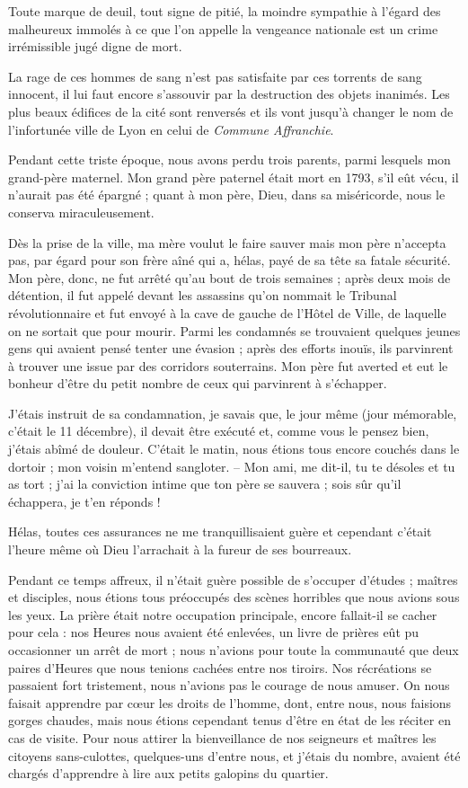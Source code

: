\documentclass[11pt,a4paper]{report}
\begin{document}
Toute marque de deuil, tout signe de pitié, la moindre sympathie à l'égard des malheureux immolés à ce que l'on appelle la vengeance nationale est un crime irrémissible jugé digne de mort.

La rage de ces hommes de sang n'est pas satisfaite par ces torrents de sang innocent, il lui faut encore s'assouvir par la destruction des objets inanimés. Les plus beaux édifices de la cité sont renversés et ils vont jusqu'à changer le nom de l'infortunée ville de Lyon en celui de \textit{Commune Affranchie}.

Pendant cette triste époque, nous avons perdu trois parents, parmi lesquels mon grand-père maternel. Mon grand père paternel était mort en 1793, s'il eût vécu, il n'aurait pas été épargné ; quant à mon père, Dieu, dans sa miséricorde, nous le conserva miraculeusement.

Dès la prise de la ville, ma mère voulut le faire sauver mais mon père n'accepta pas, par égard pour son frère aîné qui a, hélas, payé de sa tête sa fatale sécurité. Mon père, donc, ne fut arrêté qu'au bout de trois semaines ; après deux mois de détention, il fut appelé devant les assassins qu'on nommait le Tribunal révolutionnaire et fut envoyé à la cave de gauche de l'Hôtel de Ville, de laquelle on ne sortait que pour mourir. Parmi les condamnés se trouvaient quelques jeunes gens qui avaient pensé tenter une évasion ; après des efforts inouïs, ils parvinrent à trouver une issue par des corridors souterrains. Mon père fut averted et eut le bonheur d'être du petit nombre de ceux qui parvinrent à s'échapper.

J'étais instruit de sa condamnation, je savais que, le jour même (jour mémorable, c'était le 11 décembre), il devait être exécuté et, comme vous le pensez bien, j'étais abîmé de douleur. C'était le matin, nous étions tous encore couchés dans le dortoir ; mon voisin m'entend sangloter.
-- Mon ami, me dit-il, tu te désoles et tu as tort ; j'ai la conviction intime que ton père se sauvera ; sois sûr qu'il échappera, je t'en réponds !

Hélas, toutes ces assurances ne me tranquillisaient guère et cependant c'était l'heure même où Dieu l'arrachait à la fureur de ses bourreaux.

Pendant ce temps affreux, il n'était guère possible de s'occuper d'études ; maîtres et disciples, nous étions tous préoccupés des scènes horribles que nous avions sous les yeux. La prière était notre occupation principale, encore fallait-il se cacher pour cela : nos Heures nous avaient été enlevées, un livre de prières eût pu occasionner un arrêt de mort ; nous n'avions pour toute la communauté que deux paires d'Heures que nous tenions cachées entre nos tiroirs. Nos récréations se passaient fort tristement, nous n'avions pas le courage de nous amuser. On nous faisait apprendre par cœur les droits de l'homme, dont, entre nous, nous faisions gorges chaudes, mais nous étions cependant tenus d'être en état de les réciter en cas de visite. Pour nous attirer la bienveillance de nos seigneurs et maîtres les citoyens sans-culottes, quelques-uns d'entre nous, et j'étais du nombre, avaient été chargés d'apprendre à lire aux petits galopins du quartier.
\end{document}
